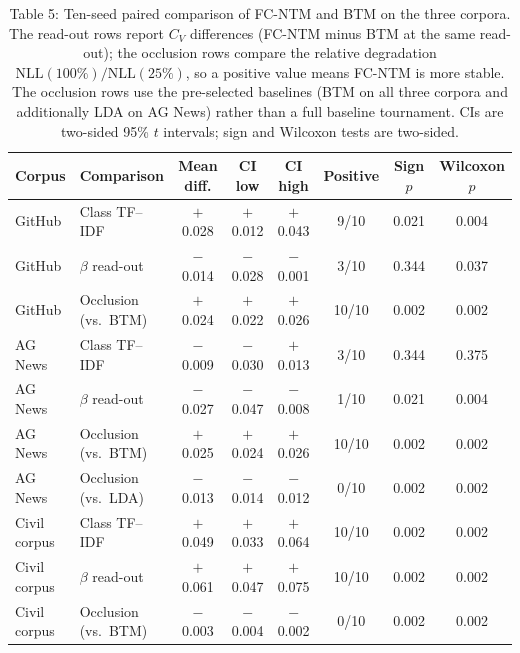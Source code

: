 \documentclass{article}
\begin{document}
\begin{table}[t]
\centering
\caption{Table 5: Ten-seed paired comparison of FC-NTM and BTM on the three corpora. The read-out rows report $C_V$ differences (FC-NTM minus BTM at the same read-out); the occlusion rows compare the relative degradation $\mathrm{NLL}(100\%)/\mathrm{NLL}(25\%)$, so a positive value means FC-NTM is more stable. The occlusion rows use the pre-selected baselines (BTM on all three corpora and additionally LDA on AG News) rather than a full baseline tournament. CIs are two-sided 95\% $t$ intervals; sign and Wilcoxon tests are two-sided.}
\label{tab:seed-paired}
\footnotesize
\setlength{\tabcolsep}{3pt}
\begin{tabular}{@{}llcccccc@{}}
\toprule
Corpus & Comparison & Mean diff. & CI low & CI high & Positive & Sign $p$ & Wilcoxon $p$ \\
\midrule
GitHub & Class TF--IDF & $+$0.028 & $+$0.012 & $+$0.043 & 9/10 & 0.021 & 0.004 \\
GitHub & $\beta$ read-out & $-$0.014 & $-$0.028 & $-$0.001 & 3/10 & 0.344 & 0.037 \\
GitHub & Occlusion (vs.\ BTM) & $+$0.024 & $+$0.022 & $+$0.026 & 10/10 & 0.002 & 0.002 \\
\midrule
AG News & Class TF--IDF & $-$0.009 & $-$0.030 & $+$0.013 & 3/10 & 0.344 & 0.375 \\
AG News & $\beta$ read-out & $-$0.027 & $-$0.047 & $-$0.008 & 1/10 & 0.021 & 0.004 \\
AG News & Occlusion (vs.\ BTM) & $+$0.025 & $+$0.024 & $+$0.026 & 10/10 & 0.002 & 0.002 \\
AG News & Occlusion (vs.\ LDA) & $-$0.013 & $-$0.014 & $-$0.012 & 0/10 & 0.002 & 0.002 \\
\midrule
Civil corpus & Class TF--IDF & $+$0.049 & $+$0.033 & $+$0.064 & 10/10 & 0.002 & 0.002 \\
Civil corpus & $\beta$ read-out & $+$0.061 & $+$0.047 & $+$0.075 & 10/10 & 0.002 & 0.002 \\
Civil corpus & Occlusion (vs.\ BTM) & $-$0.003 & $-$0.004 & $-$0.002 & 0/10 & 0.002 & 0.002 \\
\bottomrule
\end{tabular}
\end{table}
\end{document}
